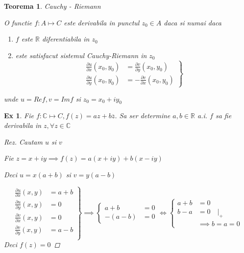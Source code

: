 \documentclass[10pt,a4paper]{article}
\newtheorem{theorem}{Teorema}
\newtheorem{example}{Ex}
\newcommand{\R}{\ensuremath{\mathbb{R}}}
\newcommand{\C}{\ensuremath{\mathbb{C}}}
\newcommand*\conj[1]{\overline{#1}}
\begin{document}
\begin{theorem}
	Cauchy - Riemann

	O functie $f:A \mapsto C$ este derivabila in punctul $z_0 \in A$ daca si numai daca

	\begin{enumerate}
		\item $f$ este $\R$ diferentiabila in $z_0$
		\item este satisfacut sistemul Cauchy-Riemann in $z_0$
		\begin{equation}
			\left .
				\begin{aligned}
					\frac{\partial u}{\partial x} (x_0,y_0) &=  \frac{\partial v}{\partial y}(x_0,y_0) \\
					\frac{\partial u}{\partial y} (x_0,y_0) &= - \frac{\partial v}{\partial x}(x_0,y_0)
				\end{aligned}
			\right \}
		\end{equation}
	\end{enumerate}
	unde $u=Re f , v = Im f $ si $z_0 = x_0 + i y_0$
\end{theorem}

\begin{example}
	Fie $f:\C \mapsto C, f(z) = az + b\conj z$. Sa ser determine $a,b \in \R$ a.i.
	$f$ sa fie derivabila in $z, \forall z \in \C$
	\begin{proof}[Rez]
		Cautam $u$ si $v$ 
		
		Fie $z=x+iy \implies f(z) = a(x+iy) + b(x-iy)$ 
		
		Deci $u=x(a+b)$ si  $v=y(a-b)$		

		\begin{displaymath}
			\left.
				\begin{aligned}
					\frac{\partial u}{\partial x} (x,y) &=  a+b \\
					\frac{\partial u}{\partial y} (x,y) &= 0    \\
					\frac{\partial v}{\partial x} (x,y) &= 0    \\
					\frac{\partial v}{\partial y} (x,y) &= a-b \\
				\end{aligned}
			\right \}
			\implies
			\left \{
				\begin{aligned}
					a+b &=0   \\
					-(a-b) &=0
				\end{aligned}
			\right.
			\iff
			\left \{
				\begin{aligned}
					a+b &=0   \\
					b-a &=0 \quad |_+ \\
					&\implies b = a = 0 
				\end{aligned}
			\right.						
		\end{displaymath}
		Deci $f(z) = 0$
	\end{proof}
\end{example}
\end{document}
